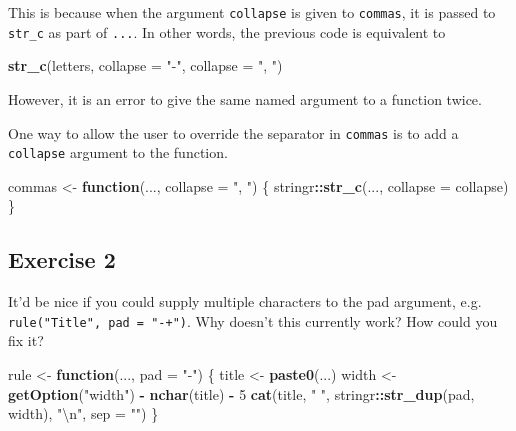 \documentclass[]{book}
\newenvironment{Shaded}{\begin{snugshade}}{\end{snugshade}}
\newcommand{\CharTok}[1]{\textcolor[rgb]{0.31,0.60,0.02}{#1}}
\newcommand{\ControlFlowTok}[1]{\textcolor[rgb]{0.13,0.29,0.53}{\textbf{#1}}}
\newcommand{\DataTypeTok}[1]{\textcolor[rgb]{0.13,0.29,0.53}{#1}}
\newcommand{\DecValTok}[1]{\textcolor[rgb]{0.00,0.00,0.81}{#1}}
\newcommand{\KeywordTok}[1]{\textcolor[rgb]{0.13,0.29,0.53}{\textbf{#1}}}
\newcommand{\NormalTok}[1]{#1}
\newcommand{\OperatorTok}[1]{\textcolor[rgb]{0.81,0.36,0.00}{\textbf{#1}}}
\newcommand{\StringTok}[1]{\textcolor[rgb]{0.31,0.60,0.02}{#1}}
\theoremstyle{plain}
\theoremstyle{remark}
\theoremstyle{definition}
\theoremstyle{definition}
\theoremstyle{definition}
\theoremstyle{remark}
\begin{document}
This is because when the argument \texttt{collapse} is given to
\texttt{commas}, it is passed to \texttt{str\_c} as part of
\texttt{...}. In other words, the previous code is equivalent to

\begin{Shaded}
\begin{Highlighting}[]
\KeywordTok{str_c}\NormalTok{(letters, }\DataTypeTok{collapse =} \StringTok{"-"}\NormalTok{, }\DataTypeTok{collapse =} \StringTok{", "}\NormalTok{)}
\end{Highlighting}
\end{Shaded}

However, it is an error to give the same named argument to a function
twice.

One way to allow the user to override the separator in \texttt{commas}
is to add a \texttt{collapse} argument to the function.

\begin{Shaded}
\begin{Highlighting}[]
\NormalTok{commas <-}\StringTok{ }\ControlFlowTok{function}\NormalTok{(..., }\DataTypeTok{collapse =} \StringTok{", "}\NormalTok{) \{}
\NormalTok{  stringr}\OperatorTok{::}\KeywordTok{str_c}\NormalTok{(..., }\DataTypeTok{collapse =}\NormalTok{ collapse)}
\NormalTok{\}}
\end{Highlighting}
\end{Shaded}

\hypertarget{exercise-2-50}{%
\subsection{Exercise 2}\label{exercise-2-50}}

It'd be nice if you could supply multiple characters to the pad
argument, e.g. \texttt{rule("Title",\ pad\ =\ "-+")}. Why doesn't this
currently work? How could you fix it?

\begin{Shaded}
\begin{Highlighting}[]
\NormalTok{rule <-}\StringTok{ }\ControlFlowTok{function}\NormalTok{(..., }\DataTypeTok{pad =} \StringTok{"-"}\NormalTok{) \{}
\NormalTok{  title <-}\StringTok{ }\KeywordTok{paste0}\NormalTok{(...)}
\NormalTok{  width <-}\StringTok{ }\KeywordTok{getOption}\NormalTok{(}\StringTok{"width"}\NormalTok{) }\OperatorTok{-}\StringTok{ }\KeywordTok{nchar}\NormalTok{(title) }\OperatorTok{-}\StringTok{ }\DecValTok{5}
  \KeywordTok{cat}\NormalTok{(title, }\StringTok{" "}\NormalTok{, stringr}\OperatorTok{::}\KeywordTok{str_dup}\NormalTok{(pad, width), }\StringTok{"}\CharTok{\textbackslash{}n}\StringTok{"}\NormalTok{, }\DataTypeTok{sep =} \StringTok{""}\NormalTok{)}
\NormalTok{\}}
\end{Highlighting}
\end{Shaded}
\end{document}
